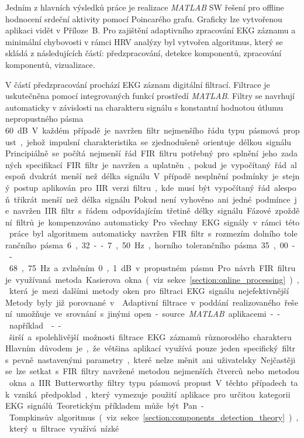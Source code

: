 Jedním z hlavních výsledků práce je realizace \textit{MATLAB} SW řešení pro
offline hodnocení srdeční aktivity pomocí Poincarého grafu. Graficky lze
vytvořenou aplikaci vidět v Příloze~B. Pro zajištění adaptivního zpracování EKG
záznamu a minimální chybovosti v rámci HRV analýzy byl vytvořen algoritmus,
který se skládá z následujících částí: předzpracování, detekce komponentů,
zpracování komponentů, vizualizace.

V částí předzpracování prochází EKG záznam digitální filtrací. Filtrace je
uskutečněna pomocí integrovaných funkcí prostředí \textit{MATLAB}. Filtry se
navrhují automaticky v závislosti na charakteru signálu s konstantní hodnotou
útlumu nepropustného pásma 60~\si\dB. V každém případě je navržen filtr
nejmenšího řádu typu pásmová propust, jehož impulsní charakteristika se
zjednodušeně orientuje délkou signálu. Principiálně se počítá nejmenší řád FIR
filtru potřebný pro splnění jeho zadaných specifikací. FIR filtr je navržen a
uplatněn, pokud je vypočítaný řád alespoň dvakrát menší než délka signálu. V
případě nesplnění podmínky je stejný postup aplikován pro IIR verzi filtru, kde
musí být vypočítaný řád alespoň třikrát menší než délka signálu. Pokud není
vyhověno ani jedné podmínce je navržen IIR filtr s řádem odpovídajícím třetině
délky signálu. Fázové zpoždění filtrů je kompenzováno automaticky. Pro všechny
EKG signály v rámci této práce byl algoritmem automaticky navržen FIR filtr s
rozmezím dolního tolerančního pásma 6,32--7,50~\si\Hz, horního tolerančního
pásma 35,00--68,75~\si\Hz~a zvlněním 0,1~\si\dB~v propustném pásmu. Pro návrh
FIR filtru je využívaná metoda Kasierova okna (viz
sekce~\ref{section:online_processing}), která je mezi dalšími metody oken pro
filtraci EKG signálu nejefektivnější. Metody byly již porovnané v
\cite{Kumar2014,Lakhwani2013,Yadav2011}. Adaptivní filtrace v poddání
realizovaného řešení umožňuje ve srovnání s jinými open-source \textit{MATLAB}
aplikacemi -- například~\cite{ecgkit,Sedghamiz2018} -- širší a spolehlivější
možnosti filtrace EKG záznamů různorodého charakteru. Hlavním důvodem je, že
většina aplikací využívá pouze jeden specifický filtr s pevně nastavenými
parametry, které nelze měnit ani uživatelsky. Nejčastěji se lze setkat s FIR
filtry navržené metodou nejmenších čtverců nebo metodou okna a IIR Butterworthy
filtry typu pásmová propust. V těchto případech tak vzniká předpoklad, který
vymezuje použití aplikace pro určitou kategorii EKG signálů. Teoretickým
příkladem může být Pan-Tompkinsův algoritmus (viz
sekce~\ref{section:components_detection_theory}), který u filtrace využívá nízké
